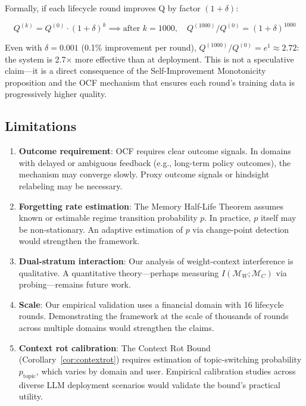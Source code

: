 \documentclass[11pt, a4paper]{article}
\begin{document}
Formally, if each lifecycle round improves Q by factor $(1 + \delta)$:

\begin{equation}
  Q^{(k)} = Q^{(0)} \cdot (1 + \delta)^k \implies \text{after } k=1000, \quad Q^{(1000)} / Q^{(0)} = (1{+}\delta)^{1000}
\end{equation}

Even with $\delta = 0.001$ (0.1\% improvement per round), $Q^{(1000)}/Q^{(0)} = e^{1} \approx 2.72$: the system is 2.7$\times$ more effective than at deployment. This is not a speculative claim---it is a direct consequence of the Self-Improvement Monotonicity proposition and the OCF mechanism that ensures each round's training data is progressively higher quality.

\subsection{Limitations}

\begin{enumerate}
  \item \textbf{Outcome requirement}: OCF requires clear outcome signals. In domains with delayed or ambiguous feedback (e.g., long-term policy outcomes), the mechanism may converge slowly. Proxy outcome signals or hindsight relabeling may be necessary.
  
  \item \textbf{Forgetting rate estimation}: The Memory Half-Life Theorem assumes known or estimable regime transition probability $p$. In practice, $p$ itself may be non-stationary. An adaptive estimation of $p$ via change-point detection~\cite{adams2007bayesian} would strengthen the framework.
  
  \item \textbf{Dual-stratum interaction}: Our analysis of weight-context interference is qualitative. A quantitative theory---perhaps measuring $I(\mathcal{M}_W; \mathcal{M}_C)$ via probing---remains future work.
  
  \item \textbf{Scale}: Our empirical validation uses a financial domain with 16 lifecycle rounds. Demonstrating the framework at the scale of thousands of rounds across multiple domains would strengthen the claims.
  
  \item \textbf{Context rot calibration}: The Context Rot Bound (Corollary~\ref{cor:contextrot}) requires estimation of topic-switching probability $p_{\text{topic}}$, which varies by domain and user. Empirical calibration studies across diverse LLM deployment scenarios would validate the bound's practical utility.
\end{enumerate}
\end{document}
